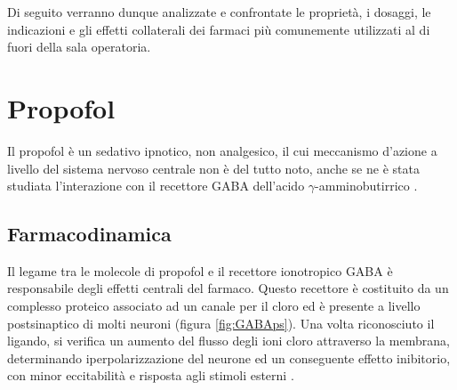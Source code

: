\bigskip

Di seguito verranno dunque analizzate e confrontate le proprietà, i dosaggi, le indicazioni e gli effetti collaterali dei farmaci più comunemente utilizzati al di fuori della sala operatoria. 





\section{Propofol}

Il propofol è un sedativo ipnotico, non analgesico, il cui meccanismo d'azione a livello del sistema nervoso centrale non è del tutto noto, anche se ne è stata studiata l'interazione con il recettore GABA dell'acido $\gamma$-amminobutirrico \cite{Propofol2015}.

\subsection*{Farmacodinamica}

Il legame tra le molecole di propofol e il recettore ionotropico GABA è responsabile degli effetti centrali del farmaco. Questo recettore è costituito da un complesso proteico associato ad un canale per il cloro ed è presente a livello postsinaptico di molti neuroni (figura \ref{fig:GABAps}). Una volta riconosciuto il ligando, si verifica un aumento del flusso degli ioni cloro attraverso la membrana, determinando iperpolarizzazione del neurone ed un conseguente effetto inibitorio, con minor eccitabilità e risposta agli stimoli esterni \cite{Propofol2015}.

